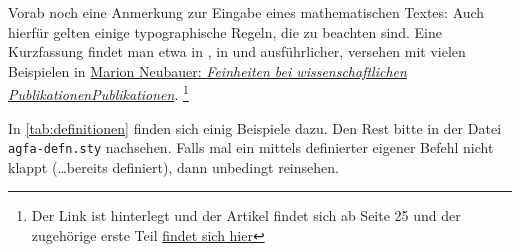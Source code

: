 Vorab noch eine Anmerkung zur Eingabe eines mathematischen Textes: Auch hierfür gelten einige typographische Regeln, die zu beachten sind.
Eine Kurzfassung findet man etwa in \textcite{nadler:formelsatz}, in \textcite[Kap. 9.1]{voss:2012a} und ausführlicher, versehen mit vielen Beispielen in \href{https://archiv.dante.de/DTK/PDF/komoedie_1997_1.pdf}{Marion Neubauer: \emph{Feinheiten bei wissenschaftlichen PublikationenPublikationen}}.%
\footnote{Der Link ist hinterlegt und der Artikel findet sich ab Seite 25 und der zugehörige erste Teil \href{https://archiv.dante.de/DTK/PDF/komoedie_1996_4.pdf}{findet sich hier}}

In \vref{tab:definitionen} finden sich einig Beispiele dazu.
Den Rest bitte in der Datei \texttt{agfa-defn.sty} nachsehen.
Falls mal ein mittels  definierter eigener Befehl nicht klappt (\ldots bereits definiert), dann unbedingt reinsehen.

